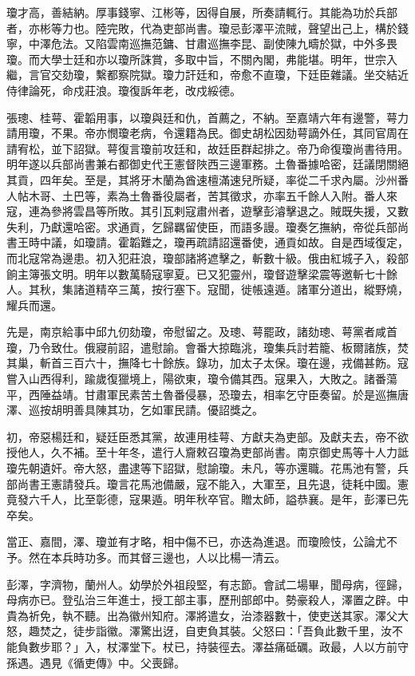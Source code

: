 \begin{pinyinscope}
瓊才高，善結納。厚事錢寧、江彬等，因得自展，所奏請輒行。其能為功於兵部者，亦彬等力也。陸完敗，代為吏部尚書。瓊忌彭澤平流賊，聲望出己上，構於錢寧，中澤危法。又陷雲南巡撫范鏞、甘肅巡撫李昆、副使陳九疇於獄，中外多畏瓊。而大學士廷和亦以瓊所誅賞，多取中旨，不關內閣，弗能堪。明年，世宗入繼，言官交劾瓊，繫都察院獄。瓊力訐廷和，帝愈不直瓊，下廷臣雜議。坐交結近侍律論死，命戍莊浪。瓊復訴年老，改戍綏德。

張璁、桂萼、霍韜用事，以瓊與廷和仇，首薦之，不納。至嘉靖六年有邊警，萼力請用瓊，不果。帝亦憫瓊老病，令還籍為民。御史胡松因劾萼謫外任，其同官周在請宥松，並下詔獄。萼復言瓊前攻廷和，故廷臣群起排之。帝乃命復瓊尚書待用。明年遂以兵部尚書兼右都御史代王憲督陜西三邊軍務。土魯番據哈密，廷議閉關絕其貢，四年矣。至是，其將牙木蘭為酋速檀滿速兒所疑，率從二千求內屬。沙州番人帖木哥、土巴等，素為土魯番役屬者，苦其徵求，亦率五千餘人入附。番人來寇，連為參將雲昌等所敗。其引瓦剌寇肅州者，遊擊彭濬擊退之。賊既失援，又數失利，乃獻還哈密。求通貢，乞歸羈留使臣，而語多謾。瓊奏乞撫納，帝從兵部尚書王時中議，如瓊請。霍韜難之，瓊再疏請詔還番使，通貢如故。自是西域復定，而北寇常為邊患。初入犯莊浪，瓊部諸將遮擊之，斬數十級。俄由紅城子入，殺部餉主簿張文明。明年以數萬騎寇寧夏。已又犯靈州，瓊督遊擊梁震等邀斬七十餘人。其秋，集諸道精卒三萬，按行塞下。寇聞，徙帳遠遁。諸軍分道出，縱野燒，耀兵而還。

先是，南京給事中邱九仞劾瓊，帝慰留之。及璁、萼罷政，諸劾璁、萼黨者咸首瓊，乃令致仕。俄寢前詔，遣慰諭。會番大掠臨洮，瓊集兵討若籠、板爾諸族，焚其巢，斬首三百六十，撫降七十餘族。錄功，加太子太保。瓊在邊，戎備甚飭。寇嘗入山西得利，踰歲復獵境上，陽欲東，瓊令備其西。寇果入，大敗之。諸番蕩平，西陲益靖。甘肅軍民素苦土魯番侵暴，恐瓊去，相率乞守臣奏留。於是巡撫唐澤、巡按胡明善具陳其功，乞如軍民請。優詔獎之。

初，帝惡楊廷和，疑廷臣悉其黨，故連用桂萼、方獻夫為吏部。及獻夫去，帝不欲授他人，久不補。至十年冬，遣行人齎敕召瓊為吏部尚書。南京御史馬等十人力詆瓊先朝遺奸。帝大怒，盡逮等下詔獄，慰諭瓊。未凡，等亦還職。花馬池有警，兵部尚書王憲請發兵。瓊言花馬池備嚴，寇不能入，大軍至，且先退，徒耗中國。憲竟發六千人，比至彰德，寇果遁。明年秋卒官。贈太師，謚恭襄。是年，彭澤已先卒矣。

當正、嘉間，澤、瓊並有才略，相中傷不已，亦迭為進退。而瓊險忮，公論尤不予。然在本兵時功多。而其督三邊也，人以比楊一清云。

彭澤，字濟物，蘭州人。幼學於外祖段堅，有志節。會試二場畢，聞母病，徑歸，母病亦已。登弘治三年進士，授工部主事，歷刑部郎中。勢豪殺人，澤置之辟。中貴為祈免，執不聽。出為徽州知府。澤將遣女，治漆器數十，使吏送其家。澤父大怒，趣焚之，徒步詣徽。澤驚出迓，自吏負其裝。父怒曰：「吾負此數千里，汝不能負數步耶？」入，杖澤堂下。杖已，持裝徑去。澤益痛砥礪。政最，人以方前守孫遇。遇見《循吏傳》中。父喪歸。


\end{pinyinscope}
